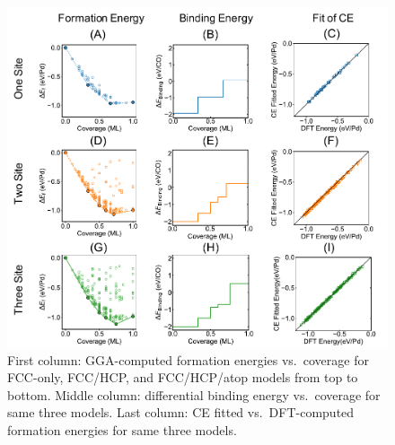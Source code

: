 \documentclass[11pt]{article}
\begin{document}
\begin{figure} [h]
	\centering
	\includegraphics[width=15cm]{Figure/AllCE.pdf}
	\caption{First column: GGA-computed formation energies vs.\ coverage for FCC-only, FCC/HCP, and FCC/HCP/atop models from top to bottom. Middle column: differential binding energy vs.\ coverage for same three models. Last column: CE fitted vs.\ DFT-computed formation energies for same three models.}
	\label{All_CE}
\end{figure}
\end{document}
